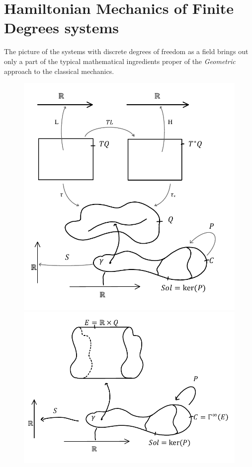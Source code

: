 \documentclass[Main]{subfiles}
\begin{document}
	\section{Hamiltonian Mechanics of Finite Degrees systems}
		The picture of the systems with discrete degrees of freedom as a field brings out only a part of the typical mathematical ingredients proper of the \emph{Geometric} approach to the classical mechanics.

		\begin{figure}[h!]
		\centering
		\begin{minipage}{0.45\textwidth}
			\centering
			\includegraphics[width=\textwidth]{Pictures/GeoMecFrame} 
		\end{minipage}\hfill
		\begin{minipage}{0.45\textwidth}
			\centering
			\includegraphics[width=\textwidth]{Pictures/FieMecFrame} 

\end{minipage}
\end{figure}
\end{document}
